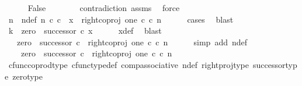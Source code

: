 \begin{isabellebody}
\ \ \ \ \isamarkupfalse%
\ False\isanewline
\ \ \ \ \ \ \isamarkupfalse%
\ contradiction\ assms{\isacharparenleft}{\kern0pt}{}{\isacharparenright}{\kern0pt}\ \isamarkupfalse%
\ force\isanewline
\ \ \isamarkupfalse%
\isanewline
\ \ \isamarkupfalse%
\ \isamarkupfalse%
\ n\ \ n{\isacharunderscore}{\kern0pt}def{\isacharcolon}{\kern0pt}\ {\isachardoublequoteopen}n\ {\isasymin}\isactrlsub c\ {\isasymnat}\isactrlsub c\ {\isasymand}\ x\ {\isacharequal}{\kern0pt}\ {\isacharparenleft}{\kern0pt}right{\isacharunderscore}{\kern0pt}coproj\ one\ {\isasymnat}\isactrlsub c{\isacharparenright}{\kern0pt}\ {\isasymcirc}\isactrlsub c\ n{\isachardoublequoteclose}\isanewline
\ \ \ \ \isamarkupfalse%
\ cases\ \isamarkupfalse%
\ blast\isanewline
\ \ \isamarkupfalse%
\ \isamarkupfalse%
\ {\isachardoublequoteopen}k\ {\isacharequal}{\kern0pt}\ zero\ {\isasymamalg}\ successor\ {\isasymcirc}\isactrlsub c\ x{\isachardoublequoteclose}\isanewline
\ \ \ \ \isamarkupfalse%
\ x{\isacharunderscore}{\kern0pt}def\ \isamarkupfalse%
\ blast\isanewline
\ \ \isamarkupfalse%
\ \isamarkupfalse%
\ {\isachardoublequoteopen}{\isachardot}{\kern0pt}{\isachardot}{\kern0pt}{\isachardot}{\kern0pt}\ {\isacharequal}{\kern0pt}\ zero\ {\isasymamalg}\ successor\ {\isasymcirc}\isactrlsub c\ \ right{\isacharunderscore}{\kern0pt}coproj\ one\ {\isasymnat}\isactrlsub c\ {\isasymcirc}\isactrlsub c\ n{\isachardoublequoteclose}\isanewline
\ \ \ \ \isamarkupfalse%
\ {\isacharparenleft}{\kern0pt}simp\ add{\isacharcolon}{\kern0pt}\ n{\isacharunderscore}{\kern0pt}def{\isacharparenright}{\kern0pt}\isanewline
\ \ \isamarkupfalse%
\ \isamarkupfalse%
\ {\isachardoublequoteopen}{\isachardot}{\kern0pt}{\isachardot}{\kern0pt}{\isachardot}{\kern0pt}\ {\isacharequal}{\kern0pt}\ \ {\isacharparenleft}{\kern0pt}zero\ {\isasymamalg}\ successor\ {\isasymcirc}\isactrlsub c\ \ right{\isacharunderscore}{\kern0pt}coproj\ one\ {\isasymnat}\isactrlsub c{\isacharparenright}{\kern0pt}\ {\isasymcirc}\isactrlsub c\ n{\isachardoublequoteclose}\isanewline
\ \ \ \ \isamarkupfalse%
\ cfunc{\isacharunderscore}{\kern0pt}coprod{\isacharunderscore}{\kern0pt}type\ cfunc{\isacharunderscore}{\kern0pt}type{\isacharunderscore}{\kern0pt}def\ comp{\isacharunderscore}{\kern0pt}associative\ n{\isacharunderscore}{\kern0pt}def\ right{\isacharunderscore}{\kern0pt}proj{\isacharunderscore}{\kern0pt}type\ successor{\isacharunderscore}{\kern0pt}type\ zero{\isacharunderscore}{\kern0pt}type\ \isamarkupfalse%

\end{isabellebody}
